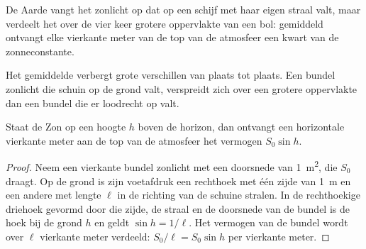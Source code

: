 \begin{omfigure}

{\small De Aarde vangt het zonlicht op dat op een schijf met haar eigen straal
valt, maar verdeelt het over de vier keer grotere oppervlakte van een bol:
gemiddeld ontvangt elke vierkante meter van de top van de atmosfeer een kwart
van de zonneconstante.}
\end{omfigure}

Het gemiddelde verbergt grote verschillen van plaats tot plaats. Een bundel
zonlicht die schuin op de grond valt, verspreidt zich over een grotere
oppervlakte dan een bundel die er loodrecht op valt.

\begin{proposition}\label{prop:g10:earth-energy-budget:height}
Staat de Zon op een hoogte $h$ boven de horizon, dan ontvangt een horizontale
vierkante meter aan de top van de atmosfeer het vermogen $S_0 \sin h$.
\end{proposition}

\begin{proof}
Neem een vierkante bundel zonlicht met een doorsnede van \qty{1}{m^2}, die
$S_0$ draagt. Op de grond is zijn voetafdruk een rechthoek met één zijde van
\qty{1}{m} en een andere met lengte $\ell$ in de richting van de schuine
stralen. In de rechthoekige driehoek gevormd door die zijde, de straal en de
doorsnede van de bundel is de hoek bij de grond $h$ en geldt $\sin h = 1/\ell$.
Het vermogen van de bundel wordt over $\ell$ vierkante meter verdeeld:
$S_0/\ell = S_0 \sin h$ per vierkante meter.
\end{proof}

